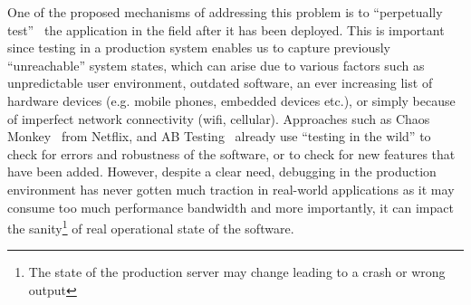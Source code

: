 One of the proposed mechanisms of addressing this problem is to ``perpetually test''~\cite{perpetual} the application in the field after it has been deployed. 
This is important since testing in a production system enables us to capture previously ``unreachable'' system states, which can arise due to various factors such as unpredictable user environment, outdated software, an ever increasing list of hardware devices (e.g. mobile phones, embedded devices etc.), or simply because of imperfect network connectivity (wifi, cellular).
Approaches such as Chaos Monkey~\cite{chaosmonkey} from Netflix, and AB Testing~\cite{abtesting} already use ``testing in the wild'' to check for errors and robustness of the software, or to check for new features that have been added.  
However, despite a clear need, debugging in the production environment has never gotten much traction in real-world applications as it may consume too much performance bandwidth and more importantly, it can impact the sanity\footnote{The state of the production server may change leading to a crash or wrong output} of real operational state of the software.




